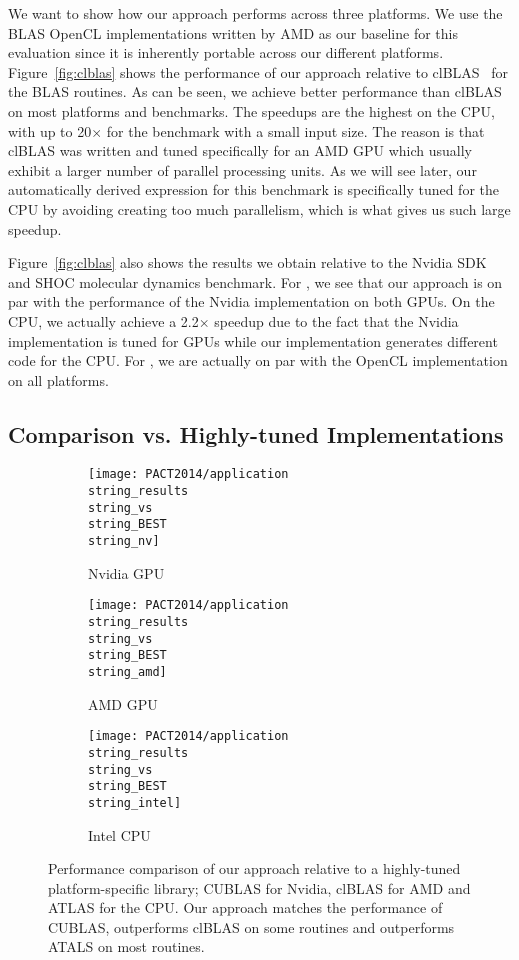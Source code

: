 We want to show how our approach performs across three platforms.
We use the BLAS OpenCL implementations written by AMD as our baseline for this evaluation since it is inherently portable across our different platforms.
Figure~\ref{fig:clblas} shows the performance of our approach relative to clBLAS~\cite{clBlas} for the BLAS routines. 
As can be seen, we achieve better performance than clBLAS on most platforms and benchmarks.
The speedups are the highest on the CPU, with up to 20$\times$ for the  benchmark with a small input size.
The reason is that clBLAS was written and tuned specifically for an AMD GPU which usually exhibit a larger number of parallel processing units.
As we will see later, our automatically derived expression for this benchmark is specifically tuned for the CPU by avoiding creating too much parallelism, which is what gives us such large speedup.

Figure~\ref{fig:clblas} also shows the results we obtain relative to the Nvidia SDK  and SHOC molecular dynamics  benchmark.
For , we see that our approach is on par with the performance of the Nvidia implementation on both GPUs.
On the CPU, we actually achieve a 2.2$\times$ speedup due to the fact that the Nvidia implementation is tuned for GPUs while our implementation generates different code for the CPU.
For , we are actually on par with the OpenCL implementation on all platforms.


\subsection{Comparison vs. Highly-tuned Implementations}

\begin{figure*}[t]
  \centering
  \begin{subfigure}[b]{0.315\linewidth}
    \texttt{[image: PACT2014/application\\string\_results\\string\_vs\\string\_BEST\\string\_nv]}
    \caption{Nvidia GPU}
    \label{fig:results-nv}
  \end{subfigure}
  \hfill
  \begin{subfigure}[b]{0.315\linewidth}
    \texttt{[image: PACT2014/application\\string\_results\\string\_vs\\string\_BEST\\string\_amd]} 
    \caption{AMD GPU}
    \label{fig:results-amd}
  \end{subfigure}
  \hfill
  \begin{subfigure}[b]{0.315\linewidth}
    \texttt{[image: PACT2014/application\\string\_results\\string\_vs\\string\_BEST\\string\_intel]} 
    \caption{Intel CPU}
    \label{fig:results-cpu}
  \end{subfigure}
  \caption{Performance comparison of our approach relative to a highly-tuned platform-specific library; CUBLAS for Nvidia, clBLAS for AMD and ATLAS for the CPU.	  
           Our approach matches the performance of CUBLAS, outperforms clBLAS on some routines and outperforms ATALS on most routines.}
   \label{fig:results}  
\end{figure*}

